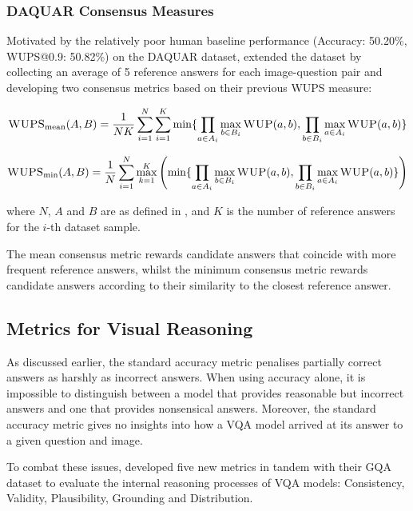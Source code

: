 \subsubsection{DAQUAR Consensus Measures}

Motivated by the relatively poor human baseline performance (Accuracy: 50.20\%, WUPS@0.9:  50.82\%) on the DAQUAR dataset, \citeauthor{malinowski2015ask} extended the dataset by collecting an average of 5 reference answers for each image-question pair and developing two consensus metrics based on their previous WUPS measure:

\begin{equation}
    \textsc{WUPS}_{\text{mean}}(A, B) =     \frac{1}{NK} \sum_{i=1}^N \sum_{i=1}^K \min \{\prod_{a \in A_i} \max_{b \in B_i} \textsc{WUP}(a, b), \prod_{b \in B_i} \max_{a \in A_i} \textsc{WUP}(a, b)\}
    \label{equation:wups_mean_consensus}
\end{equation}


\begin{equation}
    \textsc{WUPS}_{\text{min}}(A, B) =     \frac{1}{N} \sum_{i=1}^N \max_{k=1}^K \left( \min \{\prod_{a \in A_i} \max_{b \in B_i} \textsc{WUP}(a, b), \prod_{b \in B_i} \max_{a \in A_i} \textsc{WUP}(a, b)\} \right)
    \label{equation:wups_min_consensus}
\end{equation}

where \(N\), \(A\) and \(B\) are as defined in \equationautorefname{ \ref{equation:wups}}, and \(K\) is the number of reference answers for the \(i\)-th dataset sample.

The mean consensus metric rewards candidate answers that coincide with more frequent reference answers, whilst the minimum consensus metric rewards candidate answers according to their similarity to the closest reference answer.

\subsection{Metrics for Visual Reasoning}
\label{subsec:visual_reasoning_metrics}
As discussed earlier, the standard accuracy metric penalises partially correct answers as harshly as incorrect answers. When using accuracy alone, it is impossible to distinguish between a model that provides reasonable but incorrect answers and one that provides nonsensical answers. Moreover, the standard accuracy metric gives no insights into how a VQA model arrived at its answer to a given question and image.

To combat these issues, \citeauthor{hudson2019gqa} developed five new metrics in tandem with their GQA dataset \cite{hudson2019gqa} to evaluate the internal reasoning processes of VQA models: Consistency, Validity, Plausibility, Grounding and Distribution.

